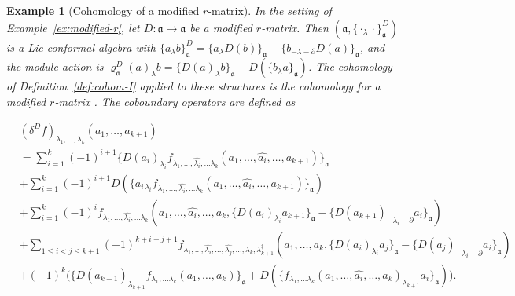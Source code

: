 \documentclass[a4paper,11pt]{article}
\def\Vs{\mathfrak{a}}
\def\rep{\varrho}
\def\la{\lambda}
\def\p{\partial}
\numberwithin{equation}{section}
\newtheorem{example}[theorem]{Example}
\begin{document}
\begin{example}[Cohomology of a  modified $r$-matrix]\label{ex:Coh modified-r}
In the setting of Example~\ref{ex:modified-r}, let $D:\Vs\to\Vs$ be
a modified $r$-matrix.  Then $(\Vs,\{\cdot_\la\cdot\}^D_\Vs)$
is a Lie conformal  algebra with
$\{a_\la b\}^D_\Vs = \{a_\la D(b)\}_\Vs - \{b_{-\la-\p}D(a)\}_\Vs$,
and the module action is
$\rep^D_\Vs(a)_\la b = \{D(a)_\la b\}_\Vs - D(\{b_\la a\}_\Vs)$.
The cohomology of Definition~\ref{def:cohom-I} applied to these structures  is the
\textit{cohomology for a  modified $r$-matrix} \cite{JS2}. The coboundary operators are defined as 

\begin{equation}\label{Coh: modified r-matrix}
\begin{split}
  &(\delta^D f)_{\la_1,\ldots,\la_k}
  (a_1,\ldots,a_{k+1}) \\
  &=\sum_{i=1}^{k}(-1)^{i+1}
     \{D(a_i)_{\la_i}
     f_{\la_1,\ldots,\widehat{\la_i},\ldots \la_k}(a_1,\ldots,\widehat{a_i},\ldots,a_{k+1})\}_\Vs
     \\
  &+\sum_{i=1}^{k}(-1)^{i+1}
D(\{a_{i\,\la_i}f_{\la_1,\ldots,\widehat{\la_i},\ldots \la_k}(a_1,\ldots,\widehat{a_i},\ldots,a_{k+1})\}_\Vs)     
     \\
  &
    + \sum_{i=1}^{k}(-1)^i
    f_{\la_1,\ldots,\widehat{\la_i},\ldots \la_k}
      (a_1,\ldots,\widehat{a_i},\ldots,a_k,
       \{D(a_{i})_{\la_i} a_{k+1}\}_\Vs-\{D(a_{k+1})_{-\la_i-\partial} a_{i}\}_\Vs)
      \\
  &
    + \!\!\sum_{1\leq i<j\leq k+1}\!\!(-1)^{k+i+j+1}
      f_{\la_1,\ldots,\widehat{\la_i},\ldots ,\widehat{\la_j},\ldots, \la_k,\la_{k+1}^\ddag}
      (a_1,\ldots,a_k,\{D(a_{i})_{\la_i} a_{j}\}_\Vs-\{D(a_{j})_{-\la_i-\partial} a_{i}\}_\Vs)
      \\
      &
     +(-1)^{k}\big(
     \{D(a_{k+1})_{\la_{k+1}}
     f_{\la_1,\ldots \la_k}(a_1,\ldots,a_{k})\}_\Vs
     +
D(\{f_{\la_1,\ldots \la_k}(a_1,\ldots,\widehat{a_i},\ldots,a_{k})_{\la_{k+1}}a_i\}_\Vs)\big).
\end{split}
\end{equation}


\end{example}
 
\end{document}
